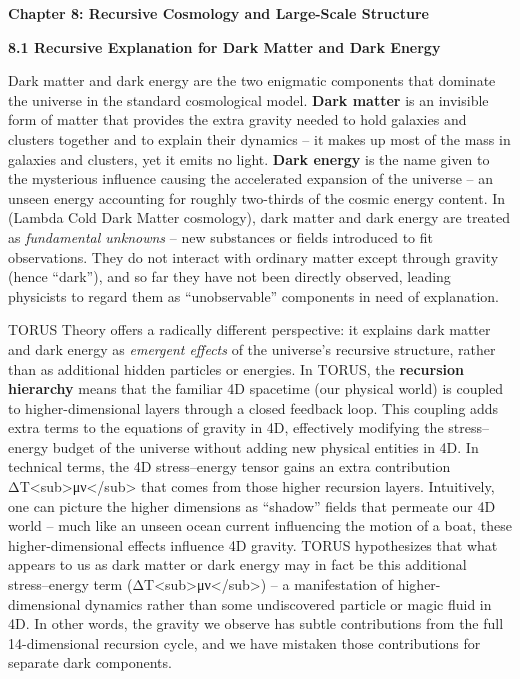 \documentclass[
]{article}
\author{}
\date{}
\begin{document}
\textbf{Chapter 8: Recursive Cosmology and Large-Scale Structure}

\textbf{8.1 Recursive Explanation for Dark Matter and Dark Energy}

Dark matter and dark energy are the two enigmatic components that
dominate the universe in the standard cosmological model. \textbf{Dark
matter} is an invisible form of matter that provides the extra gravity
needed to hold galaxies and clusters together and to explain their
dynamics -- it makes up most of the mass in galaxies and clusters, yet
it emits no light\hspace{0pt}. \textbf{Dark energy} is the name given to
the mysterious influence causing the accelerated expansion of the
universe -- an unseen energy accounting for roughly two-thirds of the
cosmic energy content. In \LambdaCDM (Lambda Cold Dark Matter cosmology), dark
matter and dark energy are treated as \emph{fundamental unknowns} -- new
substances or fields introduced to fit observations. They do not
interact with ordinary matter except through gravity (hence ``dark''),
and so far they have not been directly observed, leading physicists to
regard them as ``unobservable'' components in need of explanation.

TORUS Theory offers a radically different perspective: it explains dark
matter and dark energy as \emph{emergent effects} of the universe's
recursive structure, rather than as additional hidden particles or
energies. In TORUS, the \textbf{recursion hierarchy} means that the
familiar 4D spacetime (our physical world) is coupled to
higher-dimensional layers through a closed feedback loop. This coupling
adds extra terms to the equations of gravity in 4D, effectively
modifying the stress--energy budget of the universe without adding new
physical entities in 4D. In technical terms, the 4D stress--energy
tensor gains an extra contribution
ΔT\textless sub\textgreater μν\textless/sub\textgreater{} that comes
from those higher recursion layers\hspace{0pt}. Intuitively, one can
picture the higher dimensions as ``shadow'' fields that permeate our 4D
world -- much like an unseen ocean current influencing the motion of a
boat, these higher-dimensional effects influence 4D gravity. TORUS
hypothesizes that what appears to us as dark matter or dark energy may
in fact be this additional stress--energy term
(ΔT\textless sub\textgreater μν\textless/sub\textgreater) -- a
manifestation of higher-dimensional dynamics rather than some
undiscovered particle or magic fluid in 4D\hspace{0pt}. In other words,
the gravity we observe has subtle contributions from the full
14-dimensional recursion cycle, and we have mistaken those contributions
for separate dark components.
\end{document}

